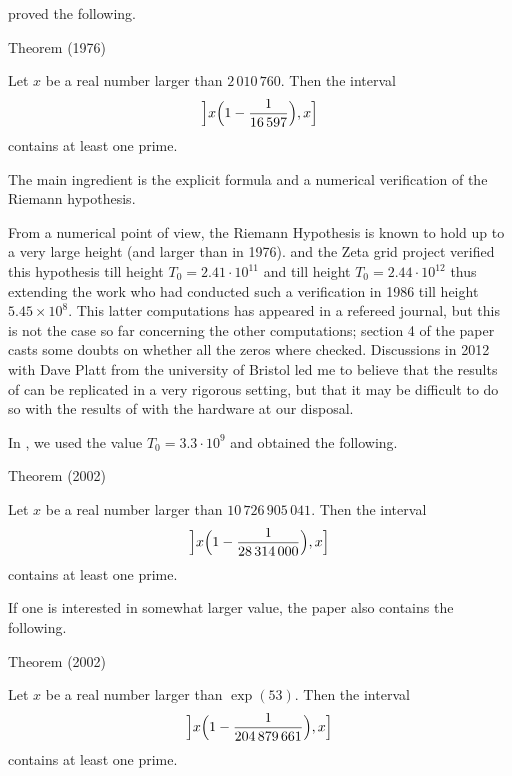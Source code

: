 \cite{Schoenfeld*76}
proved the following.

\par 
\begin{thm}{Theorem (1976)}

Let $x$ be a real number larger than $2\,010\,760$. Then the interval
$$
\Bigl] x \Bigl(1-\frac1{16\,597}\Bigr),x \Bigr]
$$
contains at least one prime.
\end{thm}


The main ingredient is the explicit formula and a numerical verification of
the Riemann hypothesis.

From a numerical point of view, the Riemann Hypothesis is known to hold up to
a very large height (and larger than in 1976).
\cite{Wedeniwski*02} and the Zeta grid
project verified this hypothesis till height $T_0=2.41\cdot 10^{11}$
and
\cite{Gourdon-Demichel*04}
till height $T_0=2.44 \cdot 10^{12}$
thus extending the work
\cite{Lune-Riele-Winter*86}
who had conducted such a verification in 1986 till
height $5.45\times10^8$.
This latter computations has appeared in a refereed journal, but this is not
the case so far concerning the other computations; section 4 of the paper
\cite{Saouter-Demichel*10}
casts some doubts on whether all the zeros where checked.
Discussions in 2012 with Dave Platt from the university of Bristol led me to
believe that the results of
\cite{Wedeniwski*02}
can be replicated in a very rigorous setting, but that it may be difficult to
do so with the results of 
\cite{Gourdon-Demichel*04}
with the
hardware at our disposal.

In
\cite{Ramare-Saouter*02},
we used
the value $T_0=3.3 \cdot 10^{9}$ and obtained the following.



\begin{thm}{Theorem (2002)}

Let $x$ be a real number larger than $10\,726\,905\,041$. Then the interval
$$
\Bigl] x \Bigl(1-\frac1{28\,314\,000}\Bigr),x \Bigr]
$$
contains at least one prime.
\end{thm}




If one is interested in somewhat larger value, the paper
\cite{Ramare-Saouter*02} also
contains the following.

\begin{thm}{Theorem (2002)}

Let $x$ be a real number larger than $\exp(53)$. Then the interval
$$
\Bigl] x \Bigl(1-\frac1{204\,879\,661}\Bigr),x \Bigr]
$$
contains at least one prime.
\end{thm}





